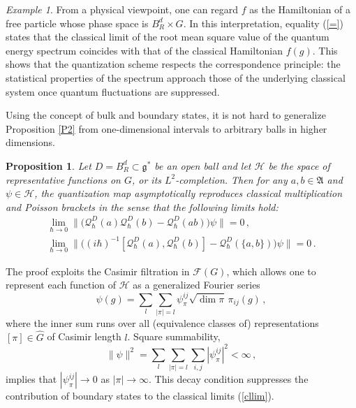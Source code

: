 \documentclass[12pt,a4paper]{article}
\numberwithin{equation}{section}
\theoremstyle{theorem}
\newtheorem{proposition}[]{Proposition}
\theoremstyle{remark}
\newtheorem{example}[equation]{Example}
\newcommand{\hh}{\mathcal{H}}
\newcommand{\fg}{\mathcal{F}(G)}
\newcommand{\gs}{\mathfrak{g}^\ast}
\newcommand{\fa}{\mathfrak{A}}
\newcommand{\qq}{\mathcal{Q}_{\hbar}}
\begin{document}
\begin{example}
From a physical viewpoint, one can regard $f$ as the Hamiltonian of a free particle whose  phase space is $B_R^d\times G$. In this interpretation, equality (\ref{=}) states that the classical limit of the  root mean square value of the quantum energy spectrum coincides with that of the classical Hamiltonian $f(g)$. This shows that the quantization scheme respects the correspondence principle: the statistical properties of the spectrum approach those of the underlying classical system once quantum fluctuations are suppressed.

\end{example}

Using the concept of bulk and boundary states, it is not hard to generalize Proposition \ref{P2} from one-dimensional intervals to  arbitrary balls in higher dimensions.

\begin{proposition}
    Let $D=B^d_R\subset\gs$ be an open ball and let $\hh$ be the space of representative functions on $G$, or its $L^2$-completion. Then for any 
    $a,b\in \fa$ and $\psi\in \hh$, the quantization map asymptotically reproduces classical multiplication and Poisson brackets in the sense that the following limits hold:
    \begin{equation}\label{cllim}
    \begin{array}{l}
     \displaystyle   \lim_{\hbar\to 0} \big\|  \big(\qq^D(a)\qq^D(b)-\qq^D(ab)\big) \psi  \big\|=0\,,\\[5mm]
   \displaystyle     \lim_{\hbar\to 0} \big\|  \big((i\hbar)^{-1}[\qq^D(a),\qq^D(b)]-\qq^D(\{a,b\})\big) \psi  \big\|=0\,.
       \end{array}
       \end{equation}
\end{proposition}

The proof exploits the Casimir filtration in $\fg$, which allows one to represent each function of $\hh$ as a generalized Fourier series 
\begin{equation}
    \psi(g)=\sum_{l}\sum_{|\pi|=l}\psi_{\pi}^{ij}\sqrt{\dim\pi}\,\pi_{ij}(g)\,,
\end{equation}
where the inner sum runs over all (equivalence classes of) representations $[\pi]\in \hat{G}$ of Casimir length $l$.  Square summability, 
\begin{equation}
    \|\psi\|^2=\sum_l\sum_{|\pi|=l}\sum_{i,j}|\psi_\pi^{ij}|^2<\infty\,,
\end{equation}
implies that $|\psi_{\pi}^{ij}|\to 0$ as $|\pi|\to\infty$. This decay condition suppresses the contribution of boundary states to the classical limits (\ref{cllim}). 
\end{document}
